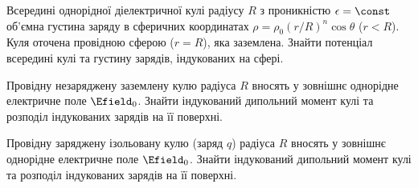 \begin{problem}
    Всередині однорідної діелектричної кулі радіусу $R$ з проникністю $\epsilon=\const$  об'ємна густина заряду в сферичних координатах  $\rho = \rho_0(r/R)^n\cos\theta$ ($r<R$). Куля оточена провідною сферою ($r = R$), яка заземлена. Знайти потенціал всередині кулі та густину зарядів, індукованих на сфері.
\end{problem}

\begin{problem}
Провідну незаряджену заземлену кулю  радіуса $R$ вносять у зовнішнє однорідне електричне поле $\Efield_0$. Знайти індукований дипольний момент кулі  та розподіл індукованих зарядів на її поверхні.
\end{problem}

\begin{problem}
Провідну заряджену ізольовану кулю (заряд $q$) радіуса $R$ вносять у зовнішнє однорідне електричне поле $\Efield_0$. Знайти індукований дипольний момент кулі  та розподіл індукованих зарядів на її поверхні.
\end{problem}

